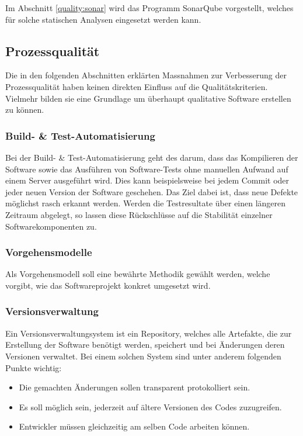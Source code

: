 Im Abschnitt \ref{quality:sonar} wird das Programm SonarQube vorgestellt, welches für solche statischen Analysen eingesetzt werden kann.

\subsection{Prozessqualität}
Die in den folgenden Abschnitten erklärten Massnahmen zur Verbesserung der Prozessqualität haben keinen direkten Einfluss auf die Qualitätskriterien.
Vielmehr bilden sie eine Grundlage um überhaupt qualitative Software erstellen zu können.

\subsubsection{Build- \& Test-Automatisierung}
Bei der Build- \& Test-Automatisierung geht des darum, dass das Kompilieren der Software sowie das Ausführen von Software-Tests ohne manuellen Aufwand auf einem Server ausgeführt wird.
Dies kann beispielsweise bei jedem Commit oder jeder neuen Version der Software geschehen.
Das Ziel dabei ist, dass neue Defekte möglichst rasch erkannt werden.
Werden die Testresultate über einen längeren Zeitraum abgelegt, so lassen diese Rückschlüsse auf die Stabilität einzelner Softwarekomponenten zu.

\subsubsection{Vorgehensmodelle}
Als Vorgehensmodell soll eine bewährte Methodik gewählt werden, welche vorgibt, wie das Softwareprojekt konkret umgesetzt wird.


\subsubsection{Versionsverwaltung}
Ein Versionsverwaltungsystem ist ein Repository, welches alle Artefakte, die zur Erstellung der Software benötigt werden, speichert und bei Änderungen deren Versionen verwaltet.
Bei einem solchen System sind unter anderem folgenden Punkte wichtig:
\begin{itemize}
   \item Die gemachten Änderungen sollen transparent protokolliert sein.
   \item Es soll möglich sein, jederzeit auf ältere Versionen des Codes zuzugreifen.
   \item Entwickler müssen gleichzeitig am selben Code arbeiten können.
\end{itemize}



